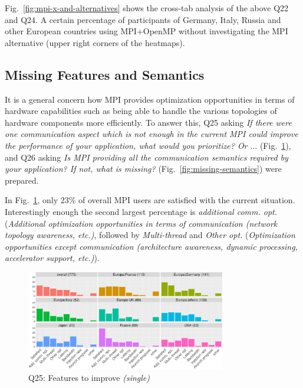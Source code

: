 \documentclass[preprint,5p,times]{elsarticle}
\def\myquote#1{{\it #1}}
\begin{document}
Fig.~\ref{fig:mpi-x-and-alternatives} shows the cross-tab analysis of
the above Q22 and Q24. A certain percentage of participants of
Germany, Italy, Russia and other European countries using MPI+OpenMP
without investigating the MPI alternative (upper right corners of the
heatmaps).

\subsection{Missing Features and Semantics}

It is a general concern how MPI provides optimization
opportunities in terms of hardware capabilities such as being able to
handle the various topologies of hardware components more
efficiently. To answer this, Q25 asking \myquote{If there were one
communication aspect which is not enough in the current MPI could
improve the performance of your application, what would you
prioritize? Or $\ldots$} (Fig.~\ref{fig:missing-features}), and Q26 asking
\myquote{Is MPI providing all the communication semantics required by your
application? If not, what is missing?}
(Fig.~\ref{fig:missing-semantics}) were prepared.

In Fig.~\ref{fig:missing-features}, only 23\% of overall MPI users
are satisfied with the current situation.
Interestingly enough the second largest percentage is
\myquote{additional comm. opt.} (\myquote{Additional optimization
  opportunities in terms of communication (network topology awareness,
  etc.)}, followed by \myquote{Multi-thread} and \myquote{Other
  opt.} (\myquote{Optimization opportunities except communication
  (architecture awareness, dynamic processing, accelerator support,
  etc.)}).

\begin{figure}[htb]
\begin{center}
\includegraphics[width=8.7cm]{R-scripts/Q25.pdf}
\caption{Q25: Features to improve {\it(single)}}
\label{fig:missing-features}
\end{center}
\end{figure}
\end{document}
